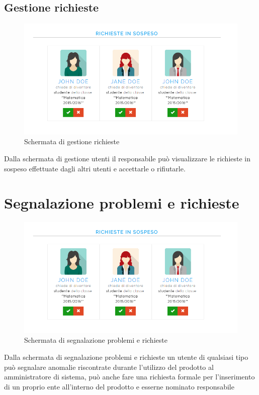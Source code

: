 \documentclass[a4paper, titlepage]{article}
\begin{document}
	 \subsection{Gestione richieste}
	 \begin{figure}[!h]
	 	\centering
	 	\includegraphics[scale=0.33]{Img/screen_GestioneRichieste.png}
	 	\caption{Schermata di gestione richieste}
	 \end{figure}
	 Dalla schermata di gestione utenti il responsabile può visualizzare le richieste in sospeso effettuate dagli altri utenti e accettarle o rifiutarle.
	 
	 \newpage
	 \section{Segnalazione problemi e richieste}
	 \begin{figure}[!h]
	 	\centering
	 	\includegraphics[scale=0.33]{Img/screen_GestioneRichieste.png}
	 	\caption{Schermata di segnalazione problemi e richieste}
	 \end{figure}
	 Dalla schermata di segnalazione problemi e richieste un utente di qualsiasi tipo può segnalare anomalie riscontrate durante l'utilizzo del prodotto al amministratore di sistema, può anche fare una richiesta formale per l'inserimento di un proprio ente all'interno del prodotto e esserne nominato responsabile
	 
\end{document}
